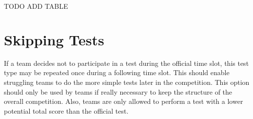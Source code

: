 TODO ADD TABLE 

\section{Skipping Tests}

If a team decides not to participate in a test during the official time slot, this test type may be repeated once during a following time slot. This should enable struggling teams to do the more simple tests later in the competition. This option should only be used by teams if really necessary to keep the structure of the overall competition. Also, teams are only allowed to perform a test with a lower potential total score than the official test.

